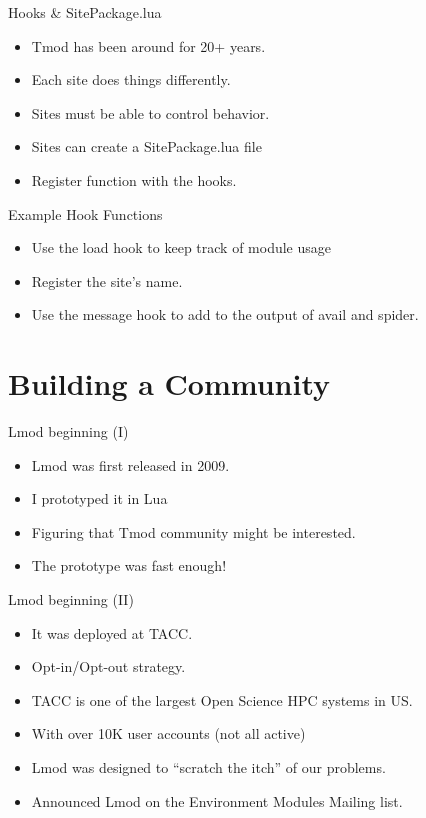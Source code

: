 \documentclass{beamer}
\begin{document}
\begin{frame}{Hooks \& SitePackage.lua}
  \begin{itemize}
    \item Tmod has been around for 20+ years.
    \item Each site does things differently.
    \item Sites must be able to control behavior.
    \item Sites can create a SitePackage.lua file
    \item Register function with the hooks.
  \end{itemize}
\end{frame}

\begin{frame}{Example Hook Functions}
  \begin{itemize}
    \item Use the load hook to keep track of module usage
    \item Register the site's name.
    \item Use the message hook to add to the output of avail and spider.
  \end{itemize}
\end{frame}

\section{Building a Community}

\begin{frame}{Lmod beginning (I)}
  \begin{itemize}
    \item Lmod was first released in 2009.
    \item I prototyped it in Lua
    \item Figuring that Tmod community might be interested.
    \item The prototype was fast enough!
  \end{itemize}
\end{frame}

\begin{frame}{Lmod beginning (II)}
  \begin{itemize}
    \item It was deployed at TACC.
    \item Opt-in/Opt-out strategy.
    \item TACC is one of the largest Open Science HPC systems in US.
    \item With over 10K user accounts (not all active)
    \item Lmod was designed to ``scratch the itch'' of our problems.
    \item Announced Lmod on the Environment Modules Mailing list.
  \end{itemize}
\end{frame}
\end{document}
